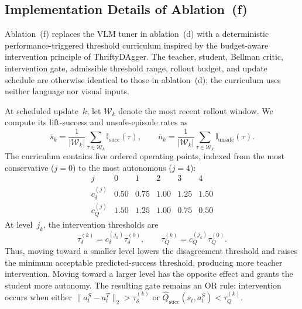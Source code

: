 \subsection{Implementation Details of Ablation~(f)}
Ablation~(f) replaces the VLM tuner in ablation~(d) with a deterministic
performance-triggered threshold curriculum inspired by the budget-aware
intervention principle of ThriftyDAgger. The teacher, student, Bellman critic,
intervention gate, admissible threshold range, rollout budget, and update
schedule are otherwise identical to those in ablation~(d); the curriculum uses
neither language nor visual inputs.

At scheduled update~$k$, let $\mathcal W_k$ denote the most recent rollout
window. We compute its lift-success and unsafe-episode rates as
\begin{equation}
\bar s_k=\frac{1}{|\mathcal W_k|}\sum_{\tau\in\mathcal W_k}
\mathbb I_{\mathrm{succ}}(\tau),\qquad
\bar u_k=\frac{1}{|\mathcal W_k|}\sum_{\tau\in\mathcal W_k}
\mathbb I_{\mathrm{unsafe}}(\tau).
\label{eq:curriculum_window_metrics}
\end{equation}
The curriculum contains five ordered operating points, indexed from the most
conservative ($j=0$) to the most autonomous ($j=4$):
\begin{equation}
\begin{array}{c|ccccc}
j                         & 0    & 1    & 2    & 3    & 4 \\ \hline
c_{\delta}^{(j)}           & 0.50 & 0.75 & 1.00 & 1.25 & 1.50 \\
c_{Q}^{(j)}                & 1.50 & 1.25 & 1.00 & 0.75 & 0.50
\end{array}
\label{eq:curriculum_levels}
\end{equation}
At level~$j_k$, the intervention thresholds are
\begin{equation}
\tau_{\delta}^{(k)}=c_{\delta}^{(j_k)}\tau_{\delta}^{(0)},
\qquad
\tau_{Q}^{(k)}=c_{Q}^{(j_k)}\tau_{Q}^{(0)}.
\label{eq:curriculum_thresholds}
\end{equation}
Thus, moving toward a smaller level lowers the disagreement threshold and
raises the minimum acceptable predicted-success threshold, producing more
teacher intervention. Moving toward a larger level has the opposite effect and
grants the student more autonomy. The resulting gate remains an OR rule:
intervention occurs when either
$\lVert a_t^S-a_t^T\rVert_2>\tau_{\delta}^{(k)}$ or
$\hat Q_{\mathrm{succ}}(s_t,a_t^S)<\tau_Q^{(k)}$.

